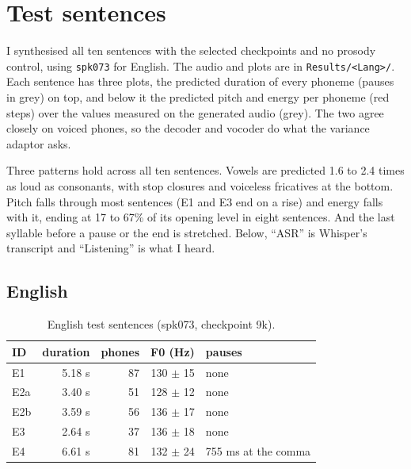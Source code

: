 \documentclass[11pt,a4paper]{article}
\newcommand{\code}[1]{\texttt{#1}}
\begin{document}
\section{Test sentences}
\label{sec:va}

I synthesised all ten sentences with the selected checkpoints and no prosody control, using \code{spk073} for
English. The audio and plots are in \code{Results/<Lang>/}. Each sentence has three plots, the predicted duration
of every phoneme (pauses in grey) on top, and below it the predicted pitch and energy per phoneme (red steps) over
the values measured on the generated audio (grey). The two agree closely on voiced phones, so the decoder and vocoder do
what the variance adaptor asks.

Three patterns hold across all ten sentences. Vowels are predicted 1.6 to 2.4 times as loud as consonants, with
stop closures and voiceless fricatives at the bottom. Pitch falls through most sentences (E1 and E3 end on a rise) and
energy falls with it, ending at 17 to 67\% of its opening level in eight sentences. And the last syllable before a pause or the end is
stretched. Below, “ASR” is Whisper's transcript and “Listening” is what I heard.

\subsection{English}
\begin{table}[!htbp]
\centering\small
\begin{tabular}{lrrrl}
\toprule
ID & duration & phones & F0 (Hz) & pauses \\
\midrule
E1 & 5.18 s & 87 & 130 $\pm$ 15 & none \\
E2a & 3.40 s & 51 & 128 $\pm$ 12 & none \\
E2b & 3.59 s & 56 & 136 $\pm$ 17 & none \\
E3 & 2.64 s & 37 & 136 $\pm$ 18 & none \\
E4 & 6.61 s & 81 & 132 $\pm$ 24 & 755 ms at the comma \\
\bottomrule
\end{tabular}
\caption{English test sentences (spk073, checkpoint 9k).}
\end{table}
\end{document}
